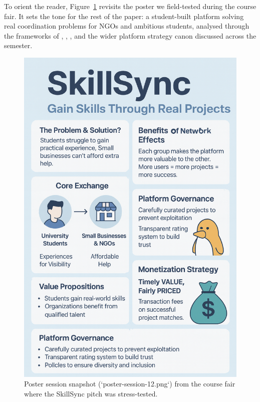 \documentclass[12pt,a4paper]{article}
\begin{document}
To orient the reader, Figure~\ref{fig:intro-showcase} revisits the poster we field-tested during the course fair. It sets the tone for the rest of the paper: a student-built platform solving real coordination problems for NGOs and ambitious students, analysed through the frameworks of \citet{Choudary2016}, \citet{Srnicek2017}, \citet{Reillier2017}, and the wider platform strategy canon discussed across the semester.

\begin{figure}[h]
  \centering
  \includegraphics[width=0.7\linewidth]{figures/introduction/poster-session-12.png}
  \caption{Poster session snapshot (`poster-session-12.png`) from the course fair where the SkillSync pitch was stress-tested.}
  \label{fig:intro-showcase}
\end{figure}












\newpage


\end{document}
